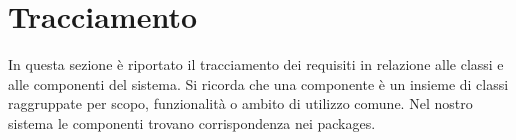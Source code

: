 \section{Tracciamento}
In questa sezione è riportato il tracciamento dei requisiti in relazione alle classi e alle componenti del sistema. Si ricorda che una componente è un insieme di classi raggruppate per scopo, funzionalità o ambito di utilizzo comune. Nel nostro sistema le componenti trovano corrispondenza nei packages.   




